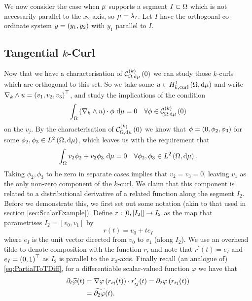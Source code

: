 We now consider the case when $\mu$ supports a segment $I\subset\Omega$ which is not necessarily parallel to the $x_2$-axis, so $\mu=\lambda_I$.
Let $I$ have the orthogonal co-ordinate system $y=\left( y_1,y_2 \right)$ with $y_1$ parallel to $I$.

\subsection{Tangential $k$-Curl} \label{sec:TangKCurl}
Now that we have a characterisation of $\mathcal{C}_{ \Omega, \mathrm{d}\mu}^{(k)}\left( 0 \right)$ we can study those $k$-curls which are orthogonal to this set.
So we take some $u\in H^1_{k,\mathrm{curl}}\left( \Omega, \mathrm{d}\mu \right)$ and write $\nabla_{k}\wedge u=\left( v_1,v_2,v_3 \right)^{\top}$, and study the implications of the condition
\begin{align*}
	\int_{\Omega}\left( \nabla_{k}\wedge u \right)\cdot\phi \ \mathrm{d}\mu = 0 \quad\forall\phi\in\mathcal{C}_{ \Omega, \mathrm{d}\mu}^{(k)}\left( 0 \right)
\end{align*}
on the $v_j$.
By the characterisation of $\mathcal{C}_{ \Omega, \mathrm{d}\mu}^{(k)}\left( 0 \right)$ we know that $\phi=\left( 0,\phi_2, \phi_3 \right)$ for some $\phi_2,\phi_3\in L^{2}\left( \Omega,\mathrm{d}\mu \right)$, which leaves us with the requirement that
\begin{align*}
	\int_{\Omega}v_2\phi_2 + v_3\phi_3 \ \mathrm{d}\mu = 0 \quad\forall\phi_2,\phi_3\in L^{2}\left( \Omega,\mathrm{d}\mu \right).
\end{align*}
Taking $\phi_2,\phi_3$ to be zero in separate cases implies that $v_2=v_3=0$, leaving $v_1$ as the only non-zero component of the $k$-curl.
We claim that this component is related to a distributional derivative of a related function along the segment $I_2$. 
Before we demonstrate this, we first set out some notation (akin to that used in section \ref{sec:ScalarExample}).
Define $r:[0,\lvert I_2 \rvert]\rightarrow I_2$ as the map that parametrises $I_2=[v_0, v_1]$ by $$r(t) = v_0 + te_I$$ where $e_I$ is the unit vector directed from $v_0$ to $v_1$ (along $I_2$).
We use an overhead tilde to denote composition with the function $r$, and note that $r^{\prime}(t) = e_I$ and $e_I=\left( 0,1 \right)^{\top}$ as $I_2$ is parallel to the $x_2$-axis. 
Finally recall (an analogue of) \eqref{eq:PartialToTDiff}, for a differentiable scalar-valued function $\varphi$ we have that
\begin{align} \label{eq:PartialToTDiff-Vector}
	\partial_t\widetilde{\varphi}(t) &= \nabla\varphi\left( r_{ij}(t) \right)\cdot r'_{ij}(t) = \partial_2\varphi\left( r_{ij}(t) \right) \\
	&= \widetilde{\partial_2\varphi}(t).
\end{align}

